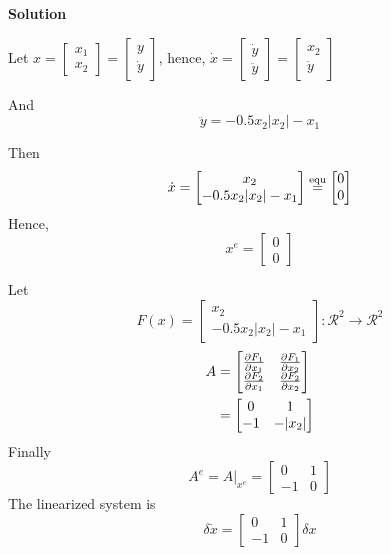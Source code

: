 \documentclass[12pt,a4paper]{article}
\begin{document}
\textbf{Solution}

Let $ x= \begin{bmatrix}
	x_1 \\ x_2 
\end{bmatrix} = \begin{bmatrix}
	y \\ \dot y
\end{bmatrix}
$, hence, $\dot x = \begin{bmatrix}
	\dot y \\ \ddot y
\end{bmatrix} = \begin{bmatrix}
x_2 \\ \ddot y 
\end{bmatrix}$

And 
\[
	\ddot y = -0.5 x_2 |x_2| - x_1
\]

Then
\[
\dot x = \begin{bmatrix}
	x_2 \\ -0.5 x_2 |x_2| - x_1
\end{bmatrix} \overset{\rm equ}{=} \begin{bmatrix}
0 \\ 0
\end{bmatrix}
\]
Hence, 
\[
x^e = \begin{bmatrix}
	0 \\ 0
\end{bmatrix}
\]

Let 
\[
	F(x) = \begin{bmatrix}
		x_2 \\ -0.5 x_2 |x_2| - x_1
	\end{bmatrix} : \mathcal R^2 \to \mathcal R^2
\]
\begin{align*}
	A &= \begin{bmatrix}
	{\partial F_1 \over \partial x_1} & {\partial F_1 \over \partial x_2} \\
	{\partial F_2 \over \partial x_1} & {\partial F_2 \over \partial x_2}
	\end{bmatrix} \\
	&= \begin{bmatrix}
		0 & 1 \\
		-1 & - |x_2|
	\end{bmatrix}
\end{align*}
Finally
\[
A^e = A \bigg|_{x^e} = \begin{bmatrix}
	0 & 1 \\ 
	-1 & 0
\end{bmatrix}
\]
The linearized system is 
\[
	\delta \dot x = \begin{bmatrix}
		0 & 1 \\ -1 & 0
	\end{bmatrix}\delta x
\]
\par\vspace{1.5cm}
\end{document}
